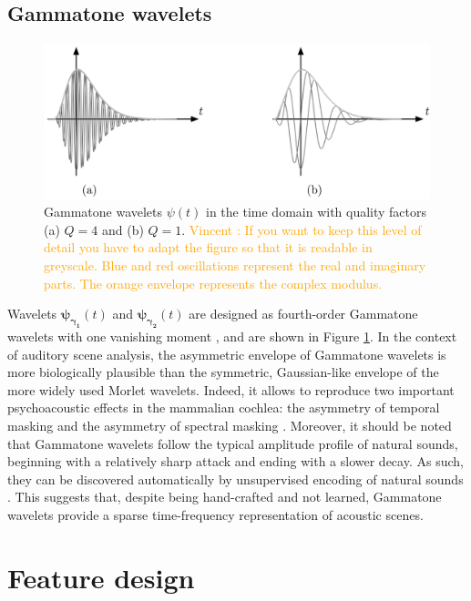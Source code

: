 \documentclass[journal]{IEEEtran}
\newcommand{\vl}[1]{\textcolor{orange}{Vincent : #1}}
\begin{document}
\subsection{Gammatone wavelets}
\begin{figure}
\begin{center}
\includegraphics[width=\columnwidth]{bw/gammatones}
\caption{
\label{fig:gammatones}
Gammatone wavelets $\psi(t)$ in the time domain with quality factors (a) $Q = 4$ and (b) $Q = 1$. 
\vl{If you want to keep this level of detail you have to adapt the figure so that it is readable in greyscale. Blue and red oscillations represent the real and imaginary parts. The orange envelope represents the complex modulus.}
}
\end{center}
\end{figure}
Wavelets
$\boldsymbol{\psi_{\gamma_1}}(t)$ and $\boldsymbol{\psi_{\gamma_2}}(t)$ are designed as fourth-order Gammatone
wavelets with one vanishing moment \cite{Venkitaraman2014}, and are shown in Figure \ref{fig:gammatones}.
In the context of auditory scene analysis, the asymmetric envelope of Gammatone wavelets is more biologically plausible than the symmetric, Gaussian-like envelope of the more widely used Morlet wavelets.
Indeed, it allows to reproduce two important psychoacoustic effects in the mammalian cochlea: the asymmetry of temporal masking and the asymmetry of spectral masking  \cite{Fastl2007}.
Moreover, it should be noted that Gammatone wavelets follow the typical amplitude profile of natural sounds, beginning with a relatively sharp attack and ending with a slower decay.
As such, they can be discovered automatically by unsupervised encoding of natural sounds \cite{Smith2006}.
This suggests that, despite being hand-crafted and not learned, Gammatone wavelets provide a sparse time-frequency representation of acoustic scenes.

\section{Feature design}
\label{sec:design}
\end{document}
